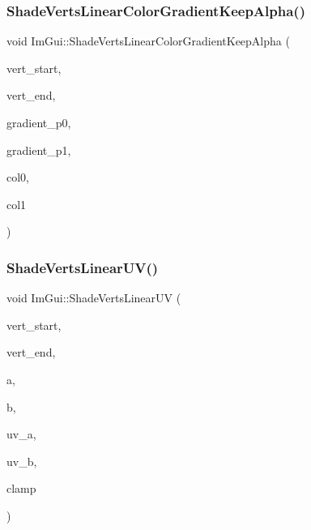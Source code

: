\subsubsection{\texorpdfstring{Shade\+Verts\+Linear\+Color\+Gradient\+Keep\+Alpha()}{ShadeVertsLinearColorGradientKeepAlpha()}}
{\footnotesize\ttfamily void Im\+Gui\+::\+Shade\+Verts\+Linear\+Color\+Gradient\+Keep\+Alpha (\begin{DoxyParamCaption}\item[{\hyperlink{struct_im_draw_vert}{Im\+Draw\+Vert} $\ast$}]{vert\+\_\+start,  }\item[{\hyperlink{struct_im_draw_vert}{Im\+Draw\+Vert} $\ast$}]{vert\+\_\+end,  }\item[{\hyperlink{struct_im_vec2}{Im\+Vec2}}]{gradient\+\_\+p0,  }\item[{\hyperlink{struct_im_vec2}{Im\+Vec2}}]{gradient\+\_\+p1,  }\item[{Im\+U32}]{col0,  }\item[{Im\+U32}]{col1 }\end{DoxyParamCaption})}

\hypertarget{namespace_im_gui_a861eab6fa8c850f2e439bf221e91461b}{}\label{namespace_im_gui_a861eab6fa8c850f2e439bf221e91461b} 
\subsubsection{\texorpdfstring{Shade\+Verts\+Linear\+U\+V()}{ShadeVertsLinearUV()}}
{\footnotesize\ttfamily void Im\+Gui\+::\+Shade\+Verts\+Linear\+UV (\begin{DoxyParamCaption}\item[{\hyperlink{struct_im_draw_vert}{Im\+Draw\+Vert} $\ast$}]{vert\+\_\+start,  }\item[{\hyperlink{struct_im_draw_vert}{Im\+Draw\+Vert} $\ast$}]{vert\+\_\+end,  }\item[{const \hyperlink{struct_im_vec2}{Im\+Vec2} \&}]{a,  }\item[{const \hyperlink{struct_im_vec2}{Im\+Vec2} \&}]{b,  }\item[{const \hyperlink{struct_im_vec2}{Im\+Vec2} \&}]{uv\+\_\+a,  }\item[{const \hyperlink{struct_im_vec2}{Im\+Vec2} \&}]{uv\+\_\+b,  }\item[{bool}]{clamp }\end{DoxyParamCaption})}

